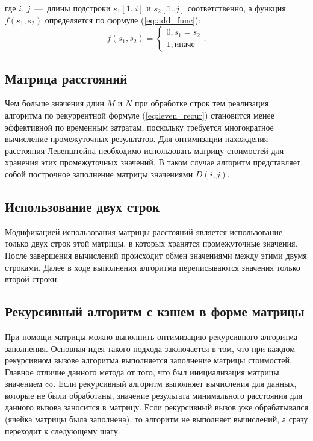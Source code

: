 где $i$, $j$~---~длины подстроки $s_{1}[1..i]$ и $s_{2}[1..j]$ соответственно, а функция $f(s_{1}, s_{2})$ определяется по формуле (\ref{eq:add_func}):
\begin{equation}
	f(s_{1}, s_{2}) =
	\begin{cases}
		0, s_{1}=s_{2}\\
		1, \text{иначе}
	\end{cases}.
	\label{eq:add_func}
\end{equation}

\subsection{Матрица расстояний}
\label{section:mtrx_dist}
Чем больше значения длин $M$ и $N$ при обработке строк тем реализация алгоритма по рекуррентной формуле (\ref{eq:leven_recur}) становится менее эффективной по временным затратам, поскольку требуется многократное вычисление промежуточных результатов. Для оптимизации нахождения расстояния Левенштейна необходимо использовать матрицу стоимостей для хранения этих промежуточных значений. В таком случае алгоритм представляет собой построчное заполнение матрицы значениями $D(i, j)$.

\subsection{Использование двух строк}
Модификацией использования матрицы расстояний является использование только двух строк этой матрицы, в которых хранятся промежуточные значения. После завершения вычислений происходит обмен значениями между этими двумя строками. Далее в ходе выполнения алгоритма переписываются значения только второй строки.

\subsection{Рекурсивный алгоритм с кэшем в форме матрицы}
При помощи матрицы можно выполнить оптимизацию рекурсивного алгоритма заполнения. Основная идея такого подхода заключается в том, что при каждом рекурсивном вызове алгоритма выполняется заполнение матрицы стоимостей. Главное отличие данного метода от того, что был  инициализация матрицы значением $\infty$. Если рекурсивный алгоритм выполняет вычисления для данных, которые не были обработаны, значение результата минимального расстояния для данного вызова заносится в матрицу. Если рекурсивный вызов уже обрабатывался (ячейка матрицы была заполнена), то алгоритм не выполняет вычислений, а сразу переходит к следующему шагу.

